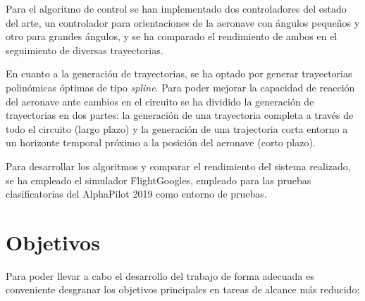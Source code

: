 Para el algoritmo de control se han implementado dos controladores del estado del arte, un controlador para orientaciones de la aeronave con ángulos pequeños y otro para grandes ángulos, y se ha comparado el rendimiento de ambos en el seguimiento de diversas trayectorias.

En cuanto a la generación de trayectorias, se ha optado por generar trayectorias polinómicas óptimas de tipo \textit{spline}. Para poder mejorar la capacidad de reacción del aeronave ante cambios en el circuito se ha dividido la  generación de trayectorias en dos partes: la generación de una trayectoria completa a través de todo el circuito (largo plazo) y la generación de una trajectoria corta entorno a un horizonte temporal próximo a la posición del aeronave (corto plazo).

Para desarrollar los algoritmos y comparar el rendimiento del sistema realizado, se ha empleado el simulador FlightGoogles, empleado para las pruebas clasificatorias del AlphaPilot 2019 como entorno de pruebas.



\section{Objetivos}


Para poder llevar a cabo el desarrollo del trabajo de forma adecuada es conveniente desgranar los objetivos principales en tareas de alcance más reducido:

